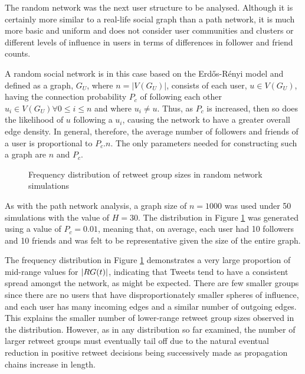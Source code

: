The random network was the next user structure to be analysed. Although it is certainly more similar to a real-life social graph than a path network, it is much more basic and uniform and does not consider user communities and clusters or different levels of influence in users in terms of differences in follower and friend counts.

A random social network is in this case based on the Erd\H{o}s-R\'{e}nyi model \cite{erdos60} and defined as a graph, $G_U$, where $n = |V(G_U)|$, consists of each user, $u \in V(G_U)$, having the connection probability $P_c$ of following each other $u_i \in V(G_U) \forall 0 \leq i \leq n$ and where $u_i \neq u$. Thus, as $P_c$ is increased, then so does the likelihood of $u$ following a $u_i$, causing the network to have a greater overall edge density. In general, therefore, the average number of followers and friends of a user is proportional to $P_c.n$. The only parameters needed for constructing such a graph are $n$ and $P_c$.

\begin{figure}[h]
\centering
{}
\caption{Frequency distribution of retweet group sizes in random network simulations}
\label{fig:random}
\end{figure}

As with the path network analysis, a graph size of $n = 1000$ was used under 50 simulations with the value of $H = 30$. The distribution in Figure \ref{fig:random} was generated using a value of $P_c = 0.01$, meaning that, on average, each user had 10 followers and 10 friends and was felt to be representative given the size of the entire graph.

The frequency distribution in Figure \ref{fig:random} demonstrates a very large proportion of mid-range values for $|RG(t)|$, indicating that Tweets tend to have a consistent spread amongst the network, as might be expected. There are few smaller groups since there are no users that have disproportionately smaller spheres of influence, and each user has many incoming edges and a similar number of outgoing edges. This explains the smaller number of lower-range retweet group sizes observed in the distribution. However, as in any distribution so far examined, the number of larger retweet groups must eventually tail off due to the natural eventual reduction in positive retweet decisions being successively made as propagation chains increase in length.


